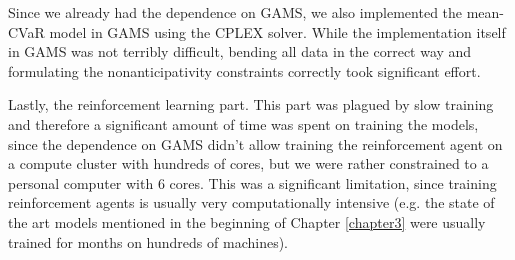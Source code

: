 Since we already had the dependence on GAMS, we also implemented the mean-CVaR model in GAMS using the CPLEX solver. While the implementation itself in GAMS was not terribly difficult, bending all data in the correct way and formulating the nonanticipativity constraints correctly took significant effort.

Lastly, the reinforcement learning part. This part was plagued by slow training and therefore a significant amount of time was spent on training the models, since the dependence on GAMS didn't allow training the reinforcement agent on a compute cluster with hundreds of cores, but we were rather constrained to a personal computer with 6 cores. This was a significant limitation, since training reinforcement agents is usually very computationally intensive (e.g. the state of the art models mentioned in the beginning of Chapter \ref{chapter3} were usually trained for months on hundreds of machines).